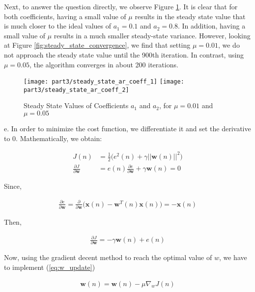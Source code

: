 \noindent{}Next, to answer the question directly, we observe Figure \ref{fig:steady_state_AR}. It is clear that for both coefficients, having a small value of $\mu$ results in the steady state value that is much closer to the ideal values of $a_1=0.1$ and $a_2=0.8$. In addition, having a small value of $\mu$ results in a much smaller steady-state variance. However, looking at Figure \ref{fig:steady_state_convergence}, we find that setting $\mu=0.01$, we do not approach the steady state value until the 900th iteration. In contrast, using $\mu=0.05$, the algorithm converges in about 200 iterations.

\begin{figure}[H]
\centering{}
\texttt{[image: part3/steady\_state\_ar\_coeff\_1]}
\texttt{[image: part3/steady\_state\_ar\_coeff\_2]}
\caption{Steady State Values of Coefficients $a_1$ and $a_2$, for $\mu=0.01$ and $\mu=0.05$}
\label{fig:steady_state_AR}
\end{figure}

\noindent{}e. In order to minimize the cost function, we differentiate it and set the derivative to 0. Mathematically, we obtain:

\begin{align}
J(n) &= \frac{1}{2}\Bigg(e^2(n)+\gamma||\textbf{w}(n)||^2\Bigg) \label{eq:cost_func}\\ 
\frac{\partial J}{\partial \textbf{w}} &= e(n)\frac{\partial e}{\partial \textbf{w}} + \gamma \textbf{w}(n) = 0 \nonumber
\end{align}

\noindent{}Since,

\begin{align*}
\frac{\partial e}{\partial \textbf{w}} = \frac{\partial}{\partial \textbf{w}}\Bigg(\textbf{x}(n) - \textbf{w}^T(n)\textbf{x}(n)\Bigg) = -\textbf{x}(n)
\end{align*}

\noindent{}Then,

\begin{align*}
\frac{\partial J}{\partial \textbf{w}} = -\gamma \textbf{w}(n) + e(n)
\end{align*}

\noindent{}Now, using the gradient decent method to reach the optimal value of $w$, we have to implement (\ref{eq:w_update})

\begin{align}
\textbf{w}(n) = \textbf{w}(n) - \mu \nabla_{w}J(n) \label{eq:w_update}
\end{align}

